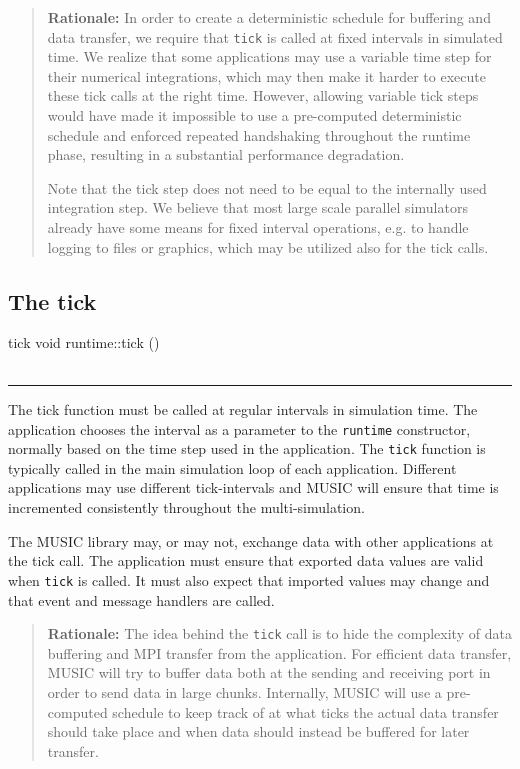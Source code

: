 \documentclass[a4paper,twoside]{report}
\makeatletter
\newenvironment{rationale}%
{\par\begin{quote}\textbf{Rationale:}}%
{\par\end{quote}}
\newenvironment{parameters}%
{\begin{tabular}{@{\hspace{2em}}lp{0.6\textwidth}}}%
{\end{tabular}\par\vspace{1mm}\par\hrule\par\vspace{5mm}}
\makeatother
\begin{document}
\begin{rationale}
  In order to create a deterministic schedule for buffering and data
  transfer, we require that \lstinline|tick| is called at fixed
  intervals in simulated time.  We realize that some applications may
  use a variable time step for their
  numerical integrations, which may then make it harder to execute
  these tick calls at the right time.  However, allowing variable tick
  steps would have made it impossible to use a pre-computed
  deterministic schedule and enforced repeated handshaking throughout
  the runtime phase, resulting in a substantial performance
  degradation.

  Note that the tick step does not need to be equal to the internally
  used integration step.  We believe that most
  large scale parallel simulators already have some means for fixed
  interval operations, e.g. to handle logging to files or graphics,
  which may be utilized also for the tick calls.
\end{rationale}


\subsection{The tick}

\begin{head}{tick}
  void runtime::tick ()
\end{head}
\begin{parameters}
\end{parameters}

The tick function must be called at regular intervals in simulation
time.  The application chooses the interval as a parameter to the
\lstinline|runtime| constructor, normally based on the time step used
in the application.  The \lstinline|tick| function is typically called
in the main simulation loop of each application.  Different
applications may use different tick-intervals and MUSIC will ensure
that time is incremented consistently throughout the multi-simulation.

The MUSIC library may, or may not, exchange data with other
applications at the tick call.  The application must ensure that
exported data values are valid when \lstinline|tick| is called.  It
must also expect that imported values may change and that event and
message handlers are called.

\begin{rationale}
  The idea behind the \lstinline|tick| call is to hide the complexity
  of data buffering and MPI transfer from the application.  For
  efficient data transfer, MUSIC will try to buffer data both at the
  sending and receiving port in order to send data in large chunks.
  Internally, MUSIC will use a pre-computed schedule to keep track of
  at what ticks the actual data transfer should take place and when
  data should instead be buffered for later transfer.
\end{rationale}
\end{document}
